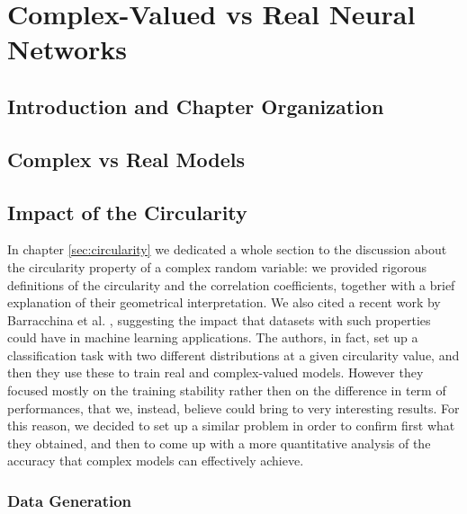 \documentclass[../main.tex]{subfiles}
\begin{document}
	
\chapter{Complex-Valued vs Real Neural Networks}

\section*{Introduction and Chapter Organization}

\section{Complex vs Real Models}

\section{Impact of the Circularity}

In chapter \ref{sec:circularity} we dedicated a whole section to the discussion about the circularity property of a complex random variable: we provided rigorous definitions of the circularity and the correlation coefficients, together with a brief explanation of their geometrical interpretation. We also cited a recent work by Barracchina et al. \cite{barrachina2021complexvalued}, suggesting the impact that datasets with such properties could have in machine learning applications. The authors, in fact, set up a classification task with two different distributions at a given circularity value, and then they use these to train real and complex-valued models. However they focused mostly on the training stability rather then on the difference in term of performances, that we, instead, believe could bring to very interesting results. For this reason, we decided to set up a similar problem in order to confirm first what they obtained, and then to come up with a more quantitative analysis of the accuracy that complex models can effectively achieve.

\subsection*{Data Generation}
\end{document}

